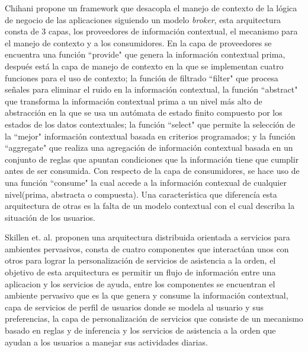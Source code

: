 Chihani \cite{Chihani201459} propone un framework que desacopla el manejo de contexto de la l\'ogica de negocio de las aplicaciones siguiendo un modelo \textit{broker}, esta arquitectura consta de 3 capas, los proveedores de informaci\'on contextual, el mecanismo para el manejo de contexto y a los consumidores. En la capa de proveedores se encuentra una funci\'on ``provide" que genera la informaci\'on contextual prima, despu\'es est\'a la capa de manejo de contexto en la que se implementan cuatro funciones para el uso de contexto; la funci\'on de filtrado ``filter" que procesa se\~nales para eliminar el ruido en la informaci\'on contextual, la funci\'on ``abstract" que transforma la informaci\'on contextual prima a un nivel m\'as alto de abstracci\'on en la que se usa un aut\'omata de estado finito compuesto por los estados de los datos contextuales; la funci\'on ``select" que permite la selecci\'on de la ``mejor" informaci\'on contextual basada en criterios programados; y la funci\'on ``aggregate" que realiza una agregaci\'on de informaci\'on contextual basada en un conjunto de reglas que apuntan condiciones que la informaci\'on tiene que cumplir antes de ser consumida. Con respecto de la capa de consumidores, se hace uso de una funci\'on ``consume" la cual accede a la informaci\'on contexual de cualquier nivel(prima, abstracta o compuesta). Una caracter\'istica que diferenc\'ia esta arquitectura de otras es la falta de un modelo contextual con el cual describa la situaci\'on de los usuarios.

Skillen et. al. \cite{Skillen201497} proponen una arquitectura distribuida orientada a servicios para ambientes pervasivos, consta de cuatro componentes que interact\'uan unos con otros para lograr la personalizaci\'on de servicios de asistencia a la orden, el objetivo de esta arquitectura es permitir un flujo de informaci\'on entre una aplicacion y los servicios de ayuda, entre los componentes se encuentran el ambiente pervasivo que es la que genera y consume la informaci\'on  contextual, capa de servicios de perfil de usuarios donde se modela al usuario y sus preferencias, la capa de personalizaci\'on de servicios que consiste de un mecanismo basado en reglas y de inferencia y los servicios de asistencia a la orden que ayudan a los usuarios a manejar sus actividades diarias.

